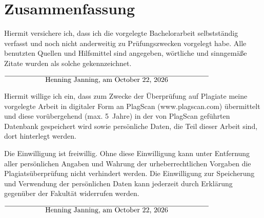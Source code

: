 \documentclass[12pt,oneside,a4paper,parskip]{scrbook}
\def\BaAuthor{Henning Janning}
\begin{document}
\chapter{Zusammenfassung}


\backmatter

\listoffigures
{}

\listoftables


\cleardoublepage
{}
{}
\printbibliography



Hiermit versichere ich, dass ich die vorgelegte Bachelorarbeit selbstständig verfasst und noch nicht anderweitig zu Prüfungszwecken vorgelegt habe. Alle benutzten Quellen und Hilfsmittel sind angegeben, wörtliche und sinngemäße Zitate wurden als solche gekennzeichnet.

\vspace{20pt}
\begin{flushright}
$\overline{~~~~~~~~~~~~~~~~~\mbox{\BaAuthor, am \today}~~~~~~~~~~~~~~~~~}$
\end{flushright}


Hiermit willige ich ein, dass zum Zwecke der Überprüfung auf Plagiate meine vorgelegte Arbeit in digitaler Form an PlagScan (www.plagscan.com) übermittelt und diese vorübergehend (max. 5~Jahre) in der von PlagScan geführten Datenbank gespeichert wird sowie persönliche Daten, die Teil dieser Arbeit sind, dort hinterlegt werden.

\begin{small}
Die Einwilligung ist freiwillig. Ohne diese Einwilligung kann unter Entfernung aller persönlichen Angaben und Wahrung der urheberrechtlichen Vorgaben die Plagiatsüberprüfung nicht verhindert werden. Die Einwilligung zur Speicherung und Verwendung der persönlichen Daten kann jederzeit durch Erklärung gegenüber der Fakultät widerrufen werden.
\end{small}

\vspace{20pt}
\begin{flushright}
$\overline{~~~~~~~~~~~~~~~~~\mbox{\BaAuthor, am \today}~~~~~~~~~~~~~~~~~}$
\end{flushright}
\end{document}
